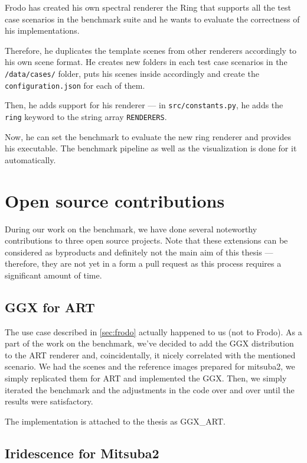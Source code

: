 Frodo has created his own spectral renderer the Ring that supports all the test case scenarios in the benchmark suite and he wants to evaluate the correctness of his implementations.

Therefore, he duplicates the template scenes from other renderers accordingly to his own scene format. He creates new folders in each test case scenarios in the \texttt{/data/cases/} folder, puts his scenes inside accordingly and create the \texttt{configuration.json} for each of them.

Then, he adds support for his renderer --- in \texttt{src/constants.py}, he adds the \texttt{ring} keyword to the string array \texttt{RENDERERS}.

Now, he can set the benchmark to evaluate the new ring renderer and provides his executable. The benchmark pipeline as well as the visualization is done for it automatically.

\section{Open source contributions}

During our work on the benchmark, we have done several noteworthy contributions to three open source projects. Note that these extensions can be considered as byproducts and definitely not the main aim of this thesis --- therefore, they are not yet in a form a pull request as this process requires a significant amount of time.

\subsection{GGX for ART}

The use case described in \autoref{sec:frodo} actually happened to us (not to Frodo). As a part of the work on the benchmark, we've decided to add the GGX distribution to the ART renderer and, coincidentally, it nicely correlated with the mentioned scenario. We had the scenes and the reference images prepared for mitsuba2, we simply replicated them for ART and implemented the GGX. Then, we simply iterated the benchmark and the adjustments in the code over and over until the results were satisfactory.

The implementation is attached to the thesis as GGX\_ART.

\subsection{Iridescence for Mitsuba2}

